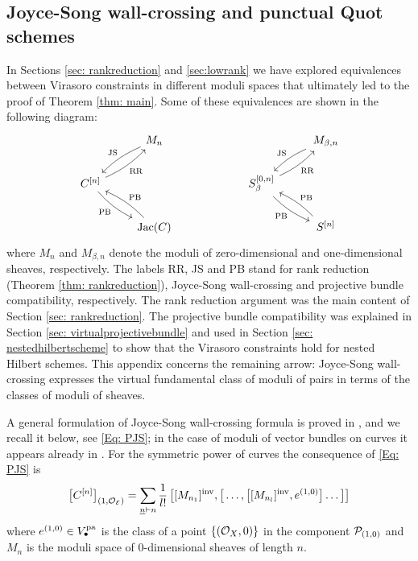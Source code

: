 \documentclass[a4paper, 12pt]{amsart}
\begin{document}
\begin{appendices}
    \section{Joyce-Song wall-crossing and punctual Quot schemes}
\label{app:A}
In Sections \ref{sec: rankreduction} and \ref{sec:lowrank} we have explored equivalences between Virasoro constraints in different moduli spaces that ultimately led to the proof of Theorem \ref{thm: main}. Some of these equivalences are shown in the following diagram:
\begin{equation}
\label{Eq:pairsheafWC}
    \begin{tikzcd}
    \, & \arrow[ld,bend right=10, "\textup{JS}", swap] M_{n} &\, &\,& \, \arrow[ld,bend right=10, "\textup{JS}", swap] M_{\beta, n}\\
    C^{[n]}\arrow[ru, bend right=10, "\textup{RR}", swap]\arrow[rd, bend right=10, "\textup{PB}", swap]& \,&\, & \, S_\beta^{[0,n]} \arrow[ru, bend right=10, "\textup{RR}", swap]\arrow[rd, bend right=10, "\textup{PB}", swap] &\, \\
    \, & \Jac(C)  \arrow[lu,bend right=10, "\textup{PB}", swap]  &\, &\, & \, S^{[n]}\arrow[lu,bend right=10, "\textup{PB}", swap] 
    \end{tikzcd}
\end{equation}
where $M_n$ and $M_{\beta,n}$ denote the moduli of zero-dimensional and one-dimensional sheaves, respectively. The labels RR, JS and PB stand for rank reduction (Theorem \ref{thm: rankreduction}), Joyce-Song wall-crossing and projective bundle compatibility, respectively. The rank reduction argument was the main content of Section \ref{sec: rankreduction}. The projective bundle compatibility was explained in Section \ref{sec: virtualprojectivebundle} and used in Section \ref{sec: nestedhilbertscheme} to show that the Virasoro constraints hold for nested Hilbert schemes. This appendix concerns the remaining arrow: Joyce-Song wall-crossing expresses the virtual fundamental class of moduli of pairs in terms of the classes of moduli of sheaves. 

 A general formulation of Joyce-Song wall-crossing formula is proved in \cite[Theorem A.4]{Bo21.5}, and we recall it below, see \eqref{Eq: PJS}; in the case of moduli of vector bundles on curves it appears already in \cite[Theorem 2.8]{Bu22}. For the symmetric power of curves the consequence of \eqref{Eq: PJS}  is
\begin{equation}\label{eq: JSsymmetricpowers}
\big[C^{[n]}\big]_{(1,{\mathcal O}_{\mathcal E})}=\sum_{\substack{ \underline{n}\vdash n}}\frac{1}{l!}\, \big[[M_{n_1}]^{\mathrm{inv}}, \big[\ldots, \big[[M_{n_l}]^{\mathrm{inv}}, e^{(1,0)}\big]\ldots\big]\big]\end{equation}
where $e^{(1,0)}\in V_\bullet^{\mathop{\rm pa}\nolimits}$ is the class of a point $\{({\mathcal O}_X, 0)\}$ in the component ${\mathcal P}_{(1,0)}$ and $M_n$ is the moduli space of 0-dimensional sheaves of length $n$. 


\end{appendices}
\end{document}
